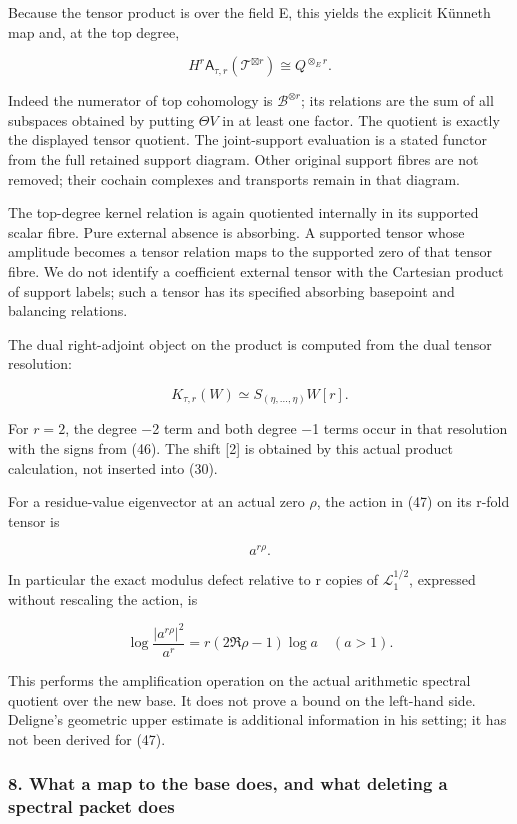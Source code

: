 Because the tensor product is over the field E, this yields the explicit Künneth map and, at the top degree,

\[
\boxed{
H^r\mathsf A_{\tau,r}(\mathcal T^{\boxtimes r})\cong Q^{\otimes_E r}.
}
\tag{47}
\]

Indeed the numerator of top cohomology is \(\mathscr B^{\otimes r}\); its relations are the sum of all subspaces obtained by putting \(\Theta V\) in at least one factor. The quotient is exactly the displayed tensor quotient. The joint-support evaluation is a stated functor from the full retained support diagram. Other original support fibres are not removed; their cochain complexes and transports remain in that diagram.

The top-degree kernel relation is again quotiented internally in its supported scalar fibre. Pure external absence is absorbing. A supported tensor whose amplitude becomes a tensor relation maps to the supported zero of that tensor fibre. We do not identify a coefficient external tensor with the Cartesian product of support labels; such a tensor has its specified absorbing basepoint and balancing relations.

The dual right-adjoint object on the product is computed from the dual tensor resolution:

\[
K_{\tau,r}(W)\simeq S_{(\eta,\ldots,\eta)}W[r].
\tag{48}
\]

For \(r=2\), the degree −2 term and both degree −1 terms occur in that resolution with the signs from (46). The shift {[}2{]} is obtained by this actual product calculation, not inserted into (30).

For a residue-value eigenvector at an actual zero \(\rho\), the action in (47) on its r-fold tensor is

\[
a^{r\rho}.
\tag{49}
\]

In particular the exact modulus defect relative to r copies of \(\mathcal L_1^{1/2}\), expressed without rescaling the action, is

\[
\log\frac{|a^{r\rho}|^2}{a^r}
=r(2\Re\rho-1)\log a\quad(a>1).
\tag{50}
\]

This performs the amplification operation on the actual arithmetic spectral quotient over the new base. It does not prove a bound on the left-hand side. Deligne's geometric upper estimate is additional information in his setting; it has not been derived for (47).

\subsubsection{8. What a map to the base does, and what deleting a spectral packet does}\label{endpoint-tau_base--what-a-map-to-the-base-does-and-what-deleting-a-spectral-packet-does}

